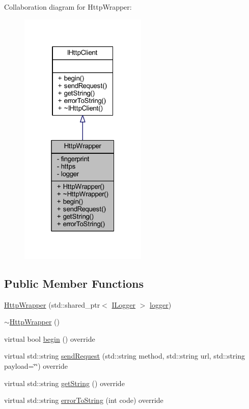 Collaboration diagram for Http\+Wrapper\+:
\nopagebreak
\begin{figure}[H]
\begin{center}
\leavevmode
\includegraphics[width=172pt]{class_http_wrapper__coll__graph}
\end{center}
\end{figure}
\subsection*{Public Member Functions}
\begin{DoxyCompactItemize}
\item 
\hyperlink{class_http_wrapper_ad2dd768eee3169e710f1398472cbdbfa}{Http\+Wrapper} (std\+::shared\+\_\+ptr$<$ \hyperlink{class_i_logger}{I\+Logger} $>$ \hyperlink{class_http_wrapper_aecd53efb752913b0a9beb14491ce8baa}{logger})
\item 
\hyperlink{class_http_wrapper_a5943777943275825f7c40e246203f59a}{$\sim$\+Http\+Wrapper} ()
\item 
virtual bool \hyperlink{class_http_wrapper_ad93bf7eb4c3d84f3b49a8b9673c207f6}{begin} () override
\item 
virtual std\+::string \hyperlink{class_http_wrapper_ab80e5851ce58d7d820dba5f13bb14fa1}{send\+Request} (std\+::string method, std\+::string url, std\+::string payload=\char`\"{}\char`\"{}) override
\item 
virtual std\+::string \hyperlink{class_http_wrapper_a4c821b412205cfc46421b06e29a53f4f}{get\+String} () override
\item 
virtual std\+::string \hyperlink{class_http_wrapper_a9d75ef86fdb6e26d6835a774442eeb9f}{error\+To\+String} (int code) override
\end{DoxyCompactItemize}
